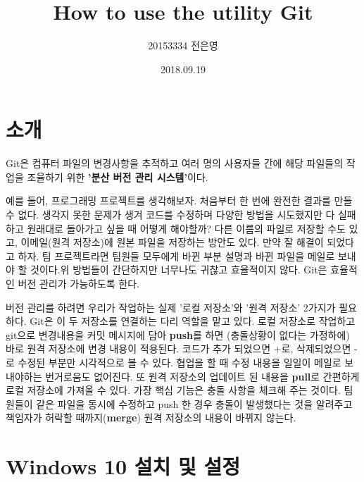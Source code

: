 \documentclass[a4paper]{article}
\title{How to use the utility Git}
\author{20153334 전은영}
\date{2018.09.19}
\begin{document}
	
	\maketitle
	
	\section{소개}
	
	Git은 컴퓨터 파일의 변경사항을 추적하고 여러 명의 사용자들 간에 해당 파일들의 작업을 조율하기 위한 \textbf{'분산 버전 관리 시스템'}이다.
	
	예를 들어, 프로그래밍 프로젝트를 생각해보자. 처음부터 한 번에 완전한 결과를 만들 수 없다. 생각지 못한 문제가 생겨 코드를 수정하며 다양한 방법을 시도했지만 다 실패하고 원래대로 돌아가고 싶을 때 어떻게 해야할까? 다른 이름의 파일로 저장할 수도 있고, 이메일(원격 저장소)에 원본 파일을 저장하는 방안도 있다. 만약 잘 해결이 되었다고 하자. 팀 프로젝트라면 팀원들 모두에게 바뀐 부분 설명과 바뀐 파일을 메일로 보내야 할 것이다.위 방법들이 간단하지만 너무나도 귀찮고 효율적이지 않다. Git은 효율적인 버전 관리가 가능하도록 한다.
	
	버전 관리를 하려면 우리가 작업하는 실제 '로컬 저장소'와 '원격 저장소' 2가지가 필요하다. Git은 이 두 저장소를 연결하는 다리 역할을 맡고 있다.
	로컬 저장소로 작업하고 git으로 변경내용을 커밋 메시지에 담아 \textbf{push}를 하면 (충돌상황이 없다는 가정하에) 바로 원격 저장소에 변경 내용이 적용된다. 코드가 추가 되었으면 +로, 삭제되었으면 -로 수정된 부분만 시각적으로 볼 수 있다. 협업을 할 때 수정 내용을 일일이 메일로 보내야하는 번거로움도 없어진다. 또 원격 저장소의 업데이트 된 내용을 \textbf{pull}로 간편하게 로컬 저장소에 가져올 수 있다. 
	가장 핵심 기능은 충돌 사항을 체크해 주는 것이다. 팀원들이 같은 파일을 동시에 수정하고 push 한 경우 충돌이 발생했다는 것을 알려주고 책임자가 허락할 때까지(\textbf{merge}) 원격 저장소의 내용이 바뀌지 않는다.
	
	
	
	\section{Windows 10 설치 및 설정}
	
\end{document}
